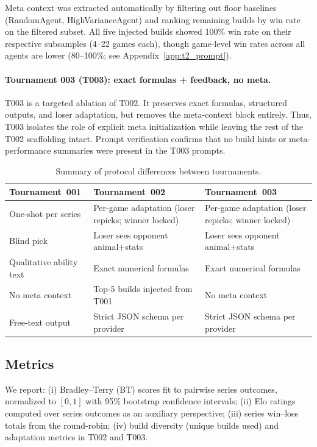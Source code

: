 \documentclass[11pt]{article}
\newcommand{\tOne}{T001}
\newcommand{\tTwo}{T002}
\newcommand{\tThree}{T003}
\begin{document}
Meta context was extracted automatically by filtering out floor baselines (RandomAgent, HighVarianceAgent) and ranking remaining builds by win rate on the filtered subset.
All five injected builds showed 100\% win rate on their respective subsamples (4--22 games each), though game-level win rates across all agents are lower (80--100\%; see Appendix~\ref{app:t2_prompt}).

\paragraph{Tournament 003 (\tThree): exact formulas + feedback, no meta.}
\tThree{} is a targeted ablation of \tTwo{}.
It preserves exact formulas, structured outputs, and loser adaptation, but removes the meta-context block entirely.
Thus, \tThree{} isolates the role of explicit meta initialization while leaving the rest of the \tTwo{} scaffolding intact.
Prompt verification confirms that no build hints or meta-performance summaries were present in the \tThree{} prompts.

\begin{table}[h]
\centering
\small
\caption{Summary of protocol differences between tournaments.}
\label{tab:protocol}
\begin{tabular}{p{} p{} p{}}
\toprule
Tournament~001 & Tournament~002 & Tournament~003 \\
\midrule
One-shot per series & Per-game adaptation (loser repicks; winner locked) & Per-game adaptation (loser repicks; winner locked) \\
Blind pick & Loser sees opponent animal+stats & Loser sees opponent animal+stats \\
Qualitative ability text & Exact numerical formulas & Exact numerical formulas \\
No meta context & Top-5 builds injected from \tOne & No meta context \\
Free-text output & Strict JSON schema per provider & Strict JSON schema per provider \\
\bottomrule
\end{tabular}
\end{table}

\subsection{Metrics}

We report:
(i) Bradley--Terry (BT) scores fit to pairwise series outcomes, normalized to $[0,1]$ with 95\% bootstrap confidence intervals;
(ii) Elo ratings computed over series outcomes as an auxiliary perspective;
(iii) series win--loss totals from the round-robin;
(iv) build diversity (unique builds used) and adaptation metrics in \tTwo{} and \tThree.
\end{document}
